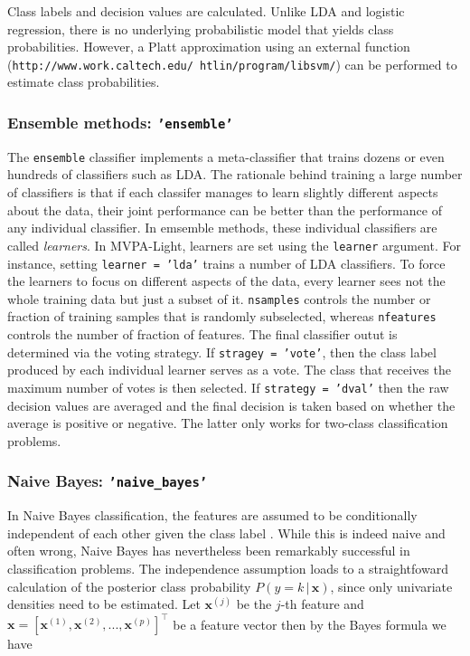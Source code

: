 \documentclass[utf8]{frontiersSCNS} %
\newcommand{\x}{\mathbf{x}}
\newcommand{\xf}[1]{\mathbf{x}^{(#1)}} %
\newcommand{\ttt}[1]{\texttt{#1}}
\begin{document}
Class labels and decision values are calculated. Unlike LDA and logistic regression,
there is no underlying probabilistic model that yields class probabilities.
However, a Platt approximation using an external function (\ttt{http://www.work.caltech.edu/~htlin/program/libsvm/}) can be performed to estimate
class probabilities.


\subsubsection{Ensemble methods: \ttt{'ensemble'}}

The \ttt{ensemble} classifier implements a meta-classifier that trains dozens
or even hundreds of classifiers such as LDA. The rationale behind training a large number of classifiers is that if each classifer manages to learn slightly different aspects about the data, their joint performance can be better than the performance of any individual classifier.
In emsemble methods, these individual classifiers are called \textit{learners}. In MVPA-Light, learners are set using the \ttt{learner} argument. For instance, setting \ttt{learner = 'lda'} trains a number of LDA classifiers. To force the learners to focus on different aspects of the data, every learner sees not the whole training data but just a subset of it. \ttt{nsamples} controls the number or fraction of training samples that is randomly subselected, whereas \ttt{nfeatures} controls the number of fraction of features.
The final classifier outut is determined via the voting strategy. If \ttt{stragey = 'vote'}, then the class label produced by each individual learner serves as a vote. The class that receives the maximum number of votes is then selected. If \ttt{strategy = 'dval'}  then the raw decision values are averaged and the final decision is taken based on whether the average is positive or negative. The latter only works for two-class classification problems.

\subsubsection{Naive Bayes: \ttt{'naive\_bayes'}}

In Naive Bayes classification, the features are assumed to be conditionally independent of each other given the class label \citep{Bishop2007}. While this is indeed naive and often wrong, Naive Bayes has nevertheless been remarkably successful in classification problems. The independence assumption loads to a straightfoward calculation of the posterior class probability $P(y = k\,|\,\x)$, since only univariate densities need to be estimated. Let $\xf{j}$ be the $j$-th feature and $\x = [\xf{1}, \xf{2}, ..., \xf{p}]^\top$ be a feature vector then by the Bayes formula we have
\end{document}
